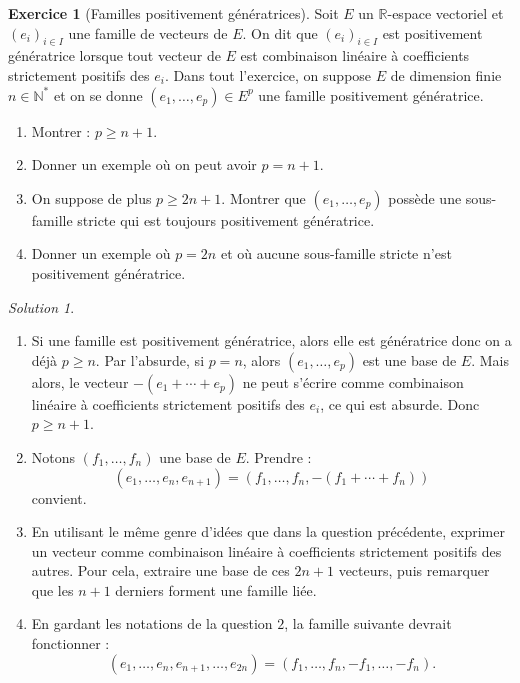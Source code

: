 \documentclass[french]{book}
\newcommand{\N}{\mathbb{N}}
\newcommand{\R}{\mathbb{R}}
\newcommand{\st}{^*}
\theoremstyle{definition}
\newtheorem{ex}{Exercice}[chapter]
\theoremstyle{remark}
\newtheorem*{sol}{Solution}
\begin{document}
\begin{ex}[Familles positivement génératrices]
	Soit $E$ un $\R$-espace vectoriel et $(e_i)_{i\in I}$ une famille de vecteurs de $E$. On dit que $(e_i)_{i\in I}$ est positivement génératrice lorsque tout vecteur de $E$ est combinaison linéaire à coefficients strictement positifs des $e_i$. Dans tout l'exercice, on suppose $E$ de dimension finie $n\in\N\st$ et on se donne $(e_1,\ldots,e_p)\in E^p$ une famille positivement génératrice.
	\begin{enumerate}
		\item Montrer : $p\geqslant n+1$.
		\item Donner un exemple où on peut avoir $p=n+1$.
		\item On suppose de plus $p\geqslant 2n+1$. Montrer que $(e_1,\ldots,e_p)$ possède une sous-famille stricte qui est toujours positivement génératrice.
		\item Donner un exemple où $p=2n$ et où aucune sous-famille stricte n'est positivement génératrice.
	\end{enumerate}
\end{ex}
\begin{sol}
	\begin{enumerate}
		\item Si une famille est positivement génératrice, alors elle est génératrice donc on a déjà $p\geqslant n$. Par l'absurde, si $p=n$, alors $(e_1,\ldots,e_p)$ est une base de $E$. Mais alors, le vecteur $-(e_1+\cdots+e_p)$ ne peut s'écrire comme combinaison linéaire à coefficients strictement positifs des $e_i$, ce qui est absurde. Donc $p\geqslant n+1$.
		\item Notons $(f_1,\ldots,f_n)$ une base de $E$. Prendre :
		$$(e_1,\ldots,e_n,e_{n+1})=(f_1,\ldots,f_n,-(f_1+\cdots+f_n))$$ convient.
		\item En utilisant le même genre d'idées que dans la question précédente, exprimer un vecteur comme combinaison linéaire à coefficients strictement positifs des autres. Pour cela, extraire une base de ces $2n+1$ vecteurs, puis remarquer que les $n+1$ derniers forment une famille liée.
		\item En gardant les notations de la question $2$, la famille suivante devrait fonctionner :
		$$(e_1,\ldots,e_n,e_{n+1},\ldots,e_{2n})=(f_1,\ldots,f_n,-f_1,\ldots,-f_n).$$
	\end{enumerate}
\end{sol}
\end{document}
